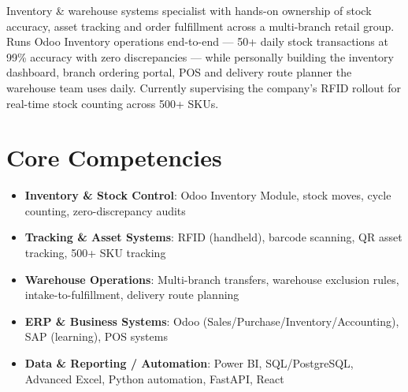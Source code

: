 \documentclass[11pt,a4paper,sans]{moderncv}
\begin{document}
\makecvtitle


\vspace{6pt}
\small{Inventory \& warehouse systems specialist with hands-on ownership of stock accuracy, asset tracking and order fulfillment across a multi-branch retail group. Runs Odoo Inventory operations end-to-end --- 50+ daily stock transactions at 99\% accuracy with zero discrepancies --- while personally building the inventory dashboard, branch ordering portal, POS and delivery route planner the warehouse team uses daily. Currently supervising the company's RFID rollout for real-time stock counting across 500+ SKUs.}


\section{Core Competencies}
\vspace{1pt}
\begin{itemize}

\item \textbf{Inventory \& Stock Control}: Odoo Inventory Module, stock moves, cycle counting, zero-discrepancy audits

\item \textbf{Tracking \& Asset Systems}: RFID (handheld), barcode scanning, QR asset tracking, 500+ SKU tracking

\item \textbf{Warehouse Operations}: Multi-branch transfers, warehouse exclusion rules, intake-to-fulfillment, delivery route planning

\item \textbf{ERP \& Business Systems}: Odoo (Sales/Purchase/Inventory/Accounting), SAP (learning), POS systems

\item \textbf{Data \& Reporting / Automation}: Power BI, SQL/PostgreSQL, Advanced Excel, Python automation, FastAPI, React

\end{itemize}

\end{document}
